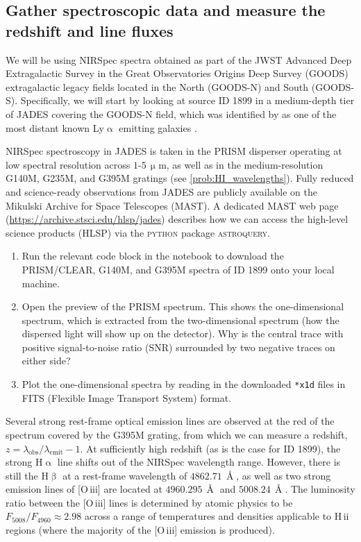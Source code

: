 \documentclass{article}
\newcommand{\Lya}{{Ly\ensuremath{\upalpha}}\xspace}
\newcommand{\HII}{\hbox{H\,{\sc ii}}\xspace}
\newcommand{\OIII}{\hbox{[O\,{\sc iii}]}\xspace}
\newcommand{\Halpha}{\ensuremath{\mathrm{H}\upalpha}\xspace}
\newcommand{\Hbeta}{\ensuremath{\mathrm{H}\upbeta}\xspace}
\theoremstyle{definition}
\begin{document}
\subsection{Gather spectroscopic data and measure the redshift and line fluxes}
\label{ssec:Measure_redshift_and_line_fluxes}

We will be using NIRSpec spectra obtained as part of the JWST Advanced Deep Extragalactic Survey \citep[JADES;][]{2023arXiv230602465E} in the Great Observatories Origins Deep Survey (GOODS) extragalactic legacy fields located in the North (GOODS-N) and South (GOODS-S). Specifically, we will start by looking at source ID 1899 in a medium-depth tier of JADES covering the GOODS-N field, which was identified by \citet{2025MNRAS.536...27W} as one of the most distant known \Lya emitting galaxies \citep[LAEs; see also][]{2024ApJ...975..208T, 2024arXiv240714201N}.

NIRSpec spectroscopy in JADES is taken in the PRISM disperser operating at low spectral resolution across $1$-$5 \, \mathrm{\upmu m}$, as well as in the medium-resolution G140M, G235M, and G395M gratings (see \cref{prob:HI_wavelengths}). Fully reduced and science-ready observations from JADES are publicly available on the Mikulski Archive for Space Telescopes (MAST). A dedicated MAST web page (\url{https://archive.stsci.edu/hlsp/jades}) describes how we can access the high-level science products (HLSP) via the \textsc{python} package \textsc{astroquery}.
\begin{enumerate}[label=(\alph*)]
    \item Run the relevant code block in the notebook to download the PRISM/CLEAR, G140M, and G395M spectra of ID 1899 onto your local machine.
    \item Open the preview of the PRISM spectrum. This shows the one-dimensional spectrum, which is extracted from the two-dimensional spectrum (how the dispersed light will show up on the detector). Why is the central trace with positive signal-to-noise ratio (SNR) surrounded by two negative traces on either side?
    \item Plot the one-dimensional spectra by reading in the downloaded \texttt{*x1d} files in FITS (Flexible Image Transport System) format.
\end{enumerate}

Several strong rest-frame optical emission lines are observed at the red of the spectrum covered by the G395M grating, from which we can measure a redshift, $z = \lambda_\mathrm{obs}/\lambda_\mathrm{emit} - 1$. At sufficiently high redshift (as is the case for ID 1899), the strong \Halpha line shifts out of the NIRSpec wavelength range. However, there is still the \Hbeta at a rest-frame wavelength of $4862.71 \, \Angstrom$, as well as two strong emission lines of \OIII are located at $4960.295 \, \Angstrom$ and $5008.24 \, \Angstrom$. The luminosity ratio between the \OIII lines is determined by atomic physics to be $F_{5008}/F_{4960} \approx 2.98$ across a range of temperatures and densities applicable to \HII regions (where the majority of the \OIII emission is produced).
\end{document}
